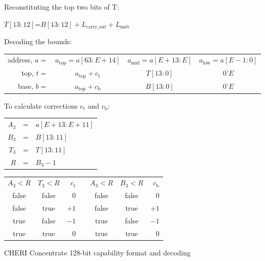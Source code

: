 \begin{figure}
Reconstituting the top two bits of T:
\begin{center}
$T[13:12] $=$ B[13:12] + L_\text{carry\_out} + L_\text{msb}$
\end{center}

Decoding the bounds:
\begin{center}
{
\renewcommand{\arraystretch}{1.5}
\begin{tabular}{r|c|c|c|}
\cline{2-4}
address, $a =$ & $a_\text{top} = a[63:E+14]$ & $a_\text{mid} = a[E+13:E]$  & $a_\text{low} = a[E-1:0]$ \\ \cline{2-4}
top, $t =$     & $a_\text{top}+c_\text{t}$   & $T[13:0]$                   & $0$'$E$ \\ \cline{2-4}
base, $b =$    & $a_\text{top}+c_\text{b}$   & $B[13:0]$                   & $0$'$E$ \\ \cline{2-4}
\end{tabular}
}
\end{center}

To calculate corrections $c_\text{t}$ and $c_\text{b}$:

\begin{center}
\begin{tabular}{r c l}
  $A_3$ &=& $a[E+13:E+11]$ \\
  $B_3$ &=& $B[13:11]$     \\
  $T_3$ &=& $T[13:11]$     \\
  $R$   &=& $B_3 - 1$      \\
\end{tabular}
\end{center}

\begin{center}
\begin{tabular}{@{}ccr@{}p{1em}@{}ccr@{}}
\cmidrule[\heavyrulewidth]{1-3}\cmidrule[\heavyrulewidth]{5-7}
$A_3<R$ & $T_3<R$ & $c_\text{t}$&&$A_3<R$ & $B_3<R$ & $c_\text{b}$\\
\cmidrule{1-3}\cmidrule{5-7}
false & false & $0$  &&false & false & $0$  \\
false & true  & $+1$ &&false & true  & $+1$ \\
true  & false & $-1$ &&true  & false & $-1$ \\
true  & true  & $0$  &&true  & true  & $0$  \\
\cmidrule[\heavyrulewidth]{1-3}\cmidrule[\heavyrulewidth]{5-7}
\end{tabular}
\end{center}
\caption{CHERI Concentrate 128-bit capability format and decoding}
\label{fig:cheric128}
\vspace{-1.5em}
\end{figure}

